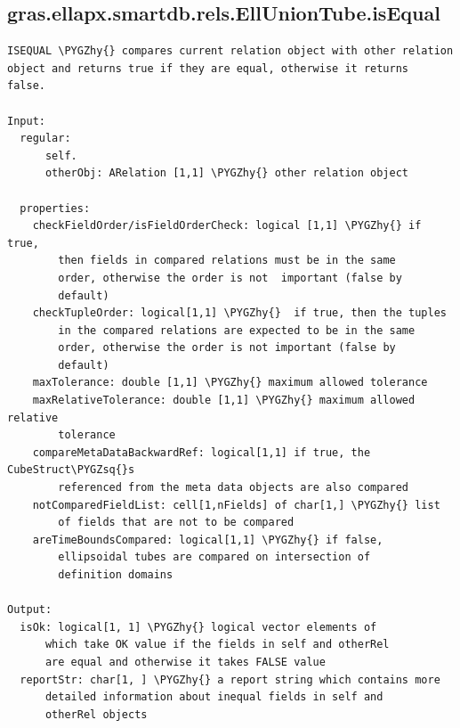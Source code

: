 \documentclass[letterpaper,10pt,english]{sphinxmanual}
\def\PYGZhy{\char`\-}
\def\PYGZsq{\char`\'}
\begin{document}
\subsection{gras.ellapx.smartdb.rels.EllUnionTube.isEqual}
\label{chap_functions:gras-ellapx-smartdb-rels-elluniontube-isequal}
\begin{Verbatim}[commandchars=\\\{\}]
ISEQUAL \PYGZhy{} compares current relation object with other relation
object and returns true if they are equal, otherwise it returns
false.

Input:
  regular:
      self.
      otherObj: ARelation [1,1] \PYGZhy{} other relation object

  properties:
    checkFieldOrder/isFieldOrderCheck: logical [1,1] \PYGZhy{} if true,
        then fields in compared relations must be in the same
        order, otherwise the order is not  important (false by
        default)
    checkTupleOrder: logical[1,1] \PYGZhy{}  if true, then the tuples
        in the compared relations are expected to be in the same
        order, otherwise the order is not important (false by
        default)
    maxTolerance: double [1,1] \PYGZhy{} maximum allowed tolerance
    maxRelativeTolerance: double [1,1] \PYGZhy{} maximum allowed relative
        tolerance
    compareMetaDataBackwardRef: logical[1,1] if true, the CubeStruct\PYGZsq{}s
        referenced from the meta data objects are also compared
    notComparedFieldList: cell[1,nFields] of char[1,] \PYGZhy{} list
        of fields that are not to be compared
    areTimeBoundsCompared: logical[1,1] \PYGZhy{} if false,
        ellipsoidal tubes are compared on intersection of
        definition domains

Output:
  isOk: logical[1, 1] \PYGZhy{} logical vector elements of
      which take OK value if the fields in self and otherRel
      are equal and otherwise it takes FALSE value
  reportStr: char[1, ] \PYGZhy{} a report string which contains more
      detailed information about inequal fields in self and
      otherRel objects
\end{Verbatim}
\end{document}
